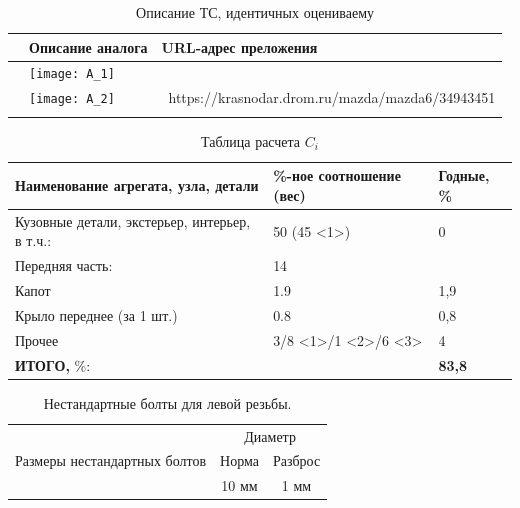\begin{longtable}{|p{5mm}|p{85mm}|p{60mm}|}
	\caption[]{\footnotesize {Описание ТС, идентичных оцениваему}} \label{tab:5}\\ 
	\hline
	\rowcolor[HTML]{C0C0C0} 
	\bf	\text{n/n} &\bf  Описание аналога & \bf URL-адрес преложения  \\ \hline \endhead
	\toprule \centering
	\Rownum  &\texttt{[image: A\_1]} &\noindent {\scriptsize\ https://krasnodar.drom.ru/mazda/mazda6/34943451} \\ \hline \toprule	\centering
	\Rownum  &\texttt{[image: A\_2]} & {\noindent \centering  \scriptsize\ https://krasnodar.drom.ru/mazda/mazda6/34943451} \\ \hline \toprule	\centering
	
\end{longtable}


\begin{longtable}{|p{9cm}|p{4cm}|p{2cm}|}
	\caption[]{\footnotesize {Таблица расчета $ C_i $ }}
	\label{tab:7}\\
	\hline
	Наименование агрегата, узла, детали & \%-ное соотношение (вес)  & Годные, \% \\
	\hline \endhead
	Кузовные детали, экстерьер, интерьер, в т.ч.: & 50 (45 \textless{}1\textgreater{}) & 0 \\
	Передняя часть: & 14 &  \\
	Капот & 1.9 & 1,9 \\
	Крыло переднее (за 1 шт.) & 0.8 & 0,8 \\

	Прочее & 3/8 \textless{}1\textgreater{}/1 \textless{}2\textgreater /6 \textless{}3\textgreater{} & 4 \\
	\hline
	\textbf{ИТОГО,} \%: &  & \textbf{83,8}  \\
	\hline	
\end{longtable}
\begin{table}[H]
	\caption{\label{tab:bolts} Нестандартные болты для левой резьбы.}
	\begin{center}
		\begin{tabular}{|c|c|c|}
			\hline
			\multirow{3}{*}{Размеры нестандартных болтов} & \multicolumn{2}{c|}{Диаметр} \\
			\cline{2-3}
			& Норма & Разброс \\
			\cline{2-3}
			& 10 мм & 1 мм \\
			\hline
		\end{tabular}
	\end{center}
\end{table}

